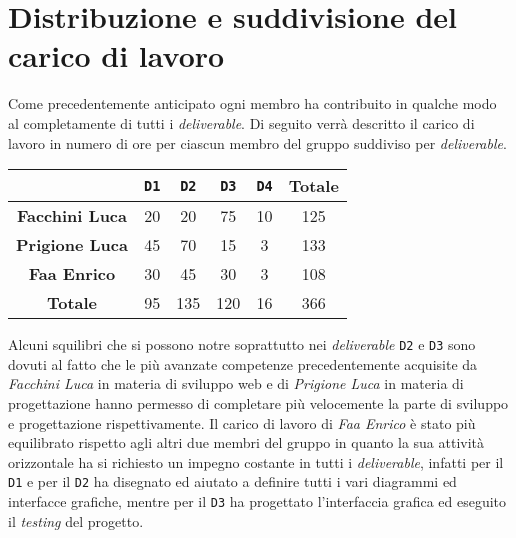 \chapter{Distribuzione e suddivisione del carico di lavoro}
    Come precedentemente anticipato ogni membro ha contribuito in qualche modo al completamente di tutti i \textit{deliverable}. Di seguito verrà descritto il carico di lavoro in numero di ore per ciascun membro del gruppo suddiviso per \textit{deliverable}.
    \begin{table}[H]
        \centering
        \begin{tabular}{|c|c|c|c|c|c|}
            \hline
            & \texttt{D1} & \texttt{D2} & \texttt{D3} & \texttt{D4} & \textbf{Totale}\\
            \hline
            \textbf{Facchini Luca} & 20 & 20 & 75 & 10 & 125\\
            \hline
            \textbf{Prigione Luca} & 45 & 70 & 15 & 3 & 133\\
            \hline
            \textbf{Faa Enrico} & 30 & 45 & 30 & 3 & 108\\
            \hline
            \textbf{Totale} & 95 & 135 & 120 & 16 & 366\\
            \hline
        \end{tabular}
    \end{table}
    Alcuni squilibri che si possono notre soprattutto nei \textit{deliverable} \texttt{D2} e \texttt{D3} sono dovuti al fatto che le più avanzate competenze precedentemente acquisite da \textit{Facchini Luca} in materia di sviluppo web e di \textit{Prigione Luca} in materia di progettazione hanno permesso di completare più velocemente la parte di sviluppo e progettazione rispettivamente. Il carico di lavoro di \textit{Faa Enrico} è stato più equilibrato rispetto agli altri due membri del gruppo in quanto la sua attività orizzontale ha si richiesto un impegno costante in tutti i \textit{deliverable}, infatti per il \texttt{D1} e per il \texttt{D2} ha disegnato ed aiutato a definire tutti i vari diagrammi ed interfacce grafiche, mentre per il \texttt{D3} ha progettato l'interfaccia grafica ed eseguito il \textit{testing} del progetto.